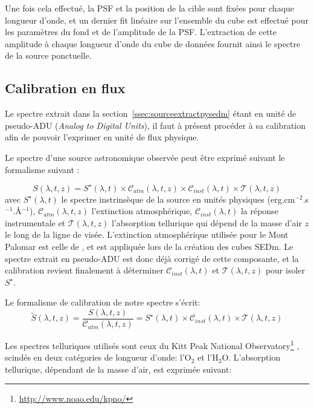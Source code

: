 \documentclass[../main/main.tex]{subfiles}
\begin{document}
Une fois cela effectué, la PSF et la position de la cible sont fixées pour
chaque longueur d'onde, et un dernier fit linéaire sur l'ensemble du
cube est effectué pour les
paramètres du fond et de l'amplitude de la PSF. L'extraction de
cette amplitude à chaque longueur d'onde du cube de données fournit
ainsi le spectre de la source ponctuelle.


\subsection{Calibration en flux}\label{ssec:calibpysedm}

Le spectre extrait dans la section~\ref{ssec:sourceextractpysedm} étant en
unité de pseudo-ADU (\textit{Analog to Digital Units}), il faut à présent procéder à sa
calibration afin de pouvoir l'exprimer en unité de flux physique.

Le spectre d'une source astronomique observée peut être exprimé suivant
le formalisme suivant \citep{Buton2013}:

\begin{equation}
  \label{eq:calibbutoon}
  S(\lambda,t,z)=S^{\star}(\lambda,t)\times\mathcal{C}_{atm}(\lambda,t,z)\times\mathcal{C}_{inst}(\lambda,t)\times\mathcal{T}(\lambda,t,z)
\end{equation}
avec $S^{\star}(\lambda,t)$ le spectre instrinsèque de la source en
unités physiques (erg.cm$^{-2}$.s$^{-1}$.\AA$^{-1}$), $\mathcal{C}_{atm}(\lambda,t,z)$
l'extinction atmosphérique, $\mathcal{C}_{inst}(\lambda,t)$ la réponse
instrumentale et $\mathcal{T}(\lambda,t,z)$ l'absorption tellurique qui
dépend de la masse d'air $z$ le long de la ligne de visée. L'extinction
atmosphérique utilisée pour le Mont Palomar est celle de
\citep{Hayes1975atm}, et est appliquée lors de la création des cubes
SEDm. Le spectre extrait en pseudo-ADU est donc déjà corrigé de cette
composante, et la calibration revient finalement à déterminer $\mathcal{C}_{inst}(\lambda,t)$ et $\mathcal{T}(\lambda,t,z)$ pour isoler $S^{\star}$.

Le formalisme de calibration de notre spectre s'écrit: 
\begin{equation*} 
  \tilde{S}(\lambda,t,z) = \frac{S(\lambda,t,z)}{\mathcal{C}_{atm}(\lambda,t,z)}=S^{\star}(\lambda,t)\times\mathcal{C}_{inst}(\lambda,t)\times\mathcal{T}(\lambda,t,z)
\end{equation*}

Les spectres telluriques utilisés sont ceux du Kitt Peak National
Observatory\footnote{\url{http://www.noao.edu/kpno/}} \citep{Hinkle2003}, scindés en deux
catégories de longueur d'onde: l'$\text{O}_{2}$ et
l'$\text{H}_{2}\text{O}$.
L'absorption tellurique, dépendant de la masse d'air, est exprimée suivant:
\end{document}
